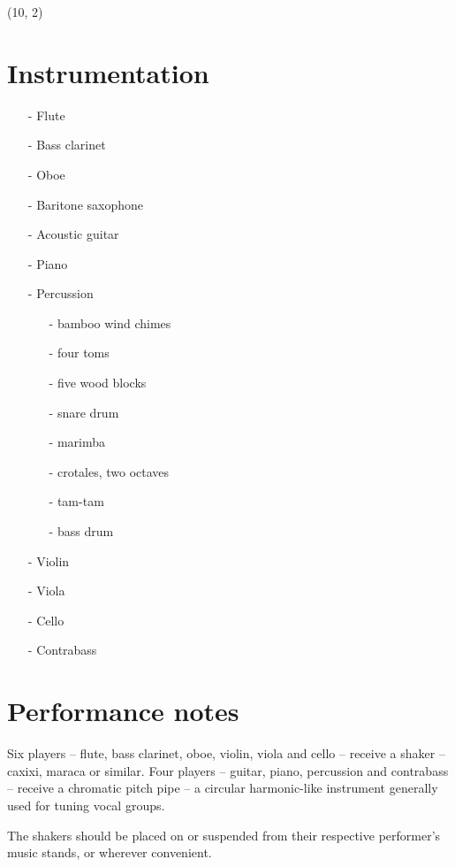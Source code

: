 \documentclass[10pt]{article}
\begin{document}
\begin{textblock}{13}(10, 2)

\section{Instrumentation}

\begin{itemize}
    \item[-] Flute
    \item[-] Bass clarinet
    \item[-] Oboe
    \item[-] Baritone saxophone
    \item[-] Acoustic guitar
    \item[-] Piano
    \item[-] Percussion
        \begin{itemize}
            \item[-] bamboo wind chimes
            \item[-] four toms
            \item[-] five wood blocks
            \item[-] snare drum
            \item[-] marimba
            \item[-] crotales, two octaves
            \item[-] tam-tam
            \item[-] bass drum
        \end{itemize}
    \item[-] Violin
    \item[-] Viola
    \item[-] Cello
    \item[-] Contrabass
\end{itemize}

\section{Performance notes}

Six players -- flute, bass clarinet, oboe, violin, viola and cello -- receive a
shaker -- caxixi, maraca or similar. Four players -- guitar, piano, percussion
and contrabass -- receive a chromatic pitch pipe -- a circular harmonic-like
instrument generally used for tuning vocal groups.

The shakers should be placed on or suspended from their respective performer's
music stands, or wherever convenient.


\end{textblock}
\end{document}
